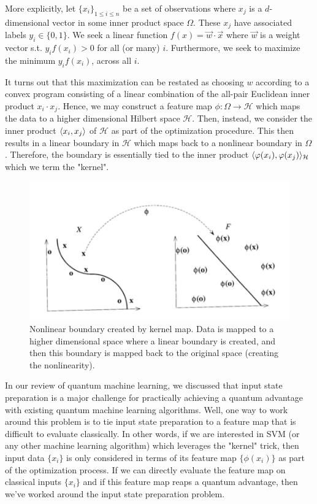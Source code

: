 \documentclass[main.tex]{subfiles}
\begin{document}
More explicitly, let $\{ x_i \}_{1 \leq i \leq n}$ be a set of observations where $x_j$ is a $d$-dimensional vector in some inner product space $\Omega$. These $x_j$ have associated labels $y_i \in \{ 0 , 1\}$. We seek a linear function $f(x) = \vec{w} \cdot \vec{x}$ where $\vec{w}$ is a weight vector s.t. $y_if(x_i) > 0$ for all (or many) $i$. Furthermore, we seek to maximize the minimum $y_i f(x_i)$, across all $i$.

It turns out that this maximization can be restated as choosing $w$ according to a convex program consisting of a linear combination of the all-pair Euclidean inner product $x_i \cdot x_j$. Hence, we may construct a feature map $\phi : \Omega \rightarrow \mathcal{H}$ which maps the data to a higher dimensional Hilbert space $\mathcal{H}$. Then, instead, we consider the inner product $\langle x_i, x_j\rangle$ of $\mathcal{H}$ as part of the optimization procedure. This then results in a linear boundary in $\mathcal{H}$ which maps back to a nonlinear boundary in $\Omega$. Therefore, the boundary is essentially tied to the inner product $\langle \varphi (x_i), \varphi(x_j) \rangle _{\mathcal{H}}$ which we term the "kernel".

\begin{figure}[H]
\centering
\includegraphics[width= 0.7\linewidth]{images/kernel}
\caption{Nonlinear boundary created by kernel map. Data is mapped to a higher dimensional space where a linear boundary is created, and then this boundary is mapped back to the original space (creating the nonlinearity).}
\end{figure}


In our review of quantum machine learning, we discussed that input state preparation is a major challenge for practically achieving a quantum advantage with existing quantum machine learning algorithms. Well, one way to work around this problem is to tie input state preparation to a feature map that is difficult to evaluate classically. In other words, if we are interested in SVM (or any other machine learning algorithm) which leverages the "kernel" trick, then input data $\{ x_i \}$ is only considered in terms of its feature map $\{ \phi(x_i) \}$ as part of the optimization process. If we can directly evaluate the feature map on classical inputs $\{ x_i \}$ and if this feature map reaps a quantum advantage, then we've worked around the input state preparation problem.
\end{document}
